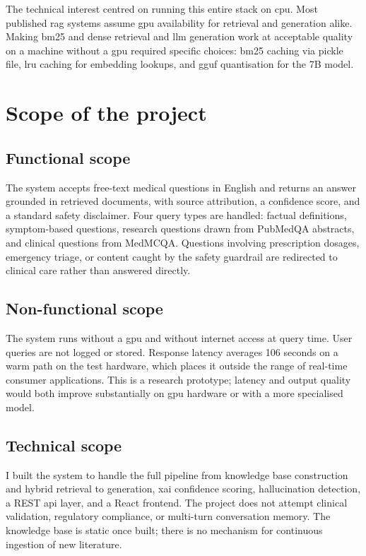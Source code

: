 The technical interest centred on running this entire stack on \ac{cpu}. Most published \ac{rag} systems assume \ac{gpu} availability for retrieval and generation alike. Making \ac{bm25} and dense retrieval and \ac{llm} generation work at acceptable quality on a machine without a \ac{gpu} required specific choices: \ac{bm25} caching via pickle file, \ac{lru} caching for embedding lookups, and \ac{gguf} quantisation for the 7B model.

\section{Scope of the project}

\subsection{Functional scope}

The system accepts free-text medical questions in English and returns an answer grounded in retrieved documents, with source attribution, a confidence score, and a standard safety disclaimer. Four query types are handled: factual definitions, symptom-based questions, research questions drawn from \allowbreak{}PubMedQA abstracts, and clinical questions from MedMCQA. Questions involving prescription dosages, emergency triage, or content caught by the safety guardrail are redirected to clinical care rather than answered directly.

\subsection{Non-functional scope}

The system runs without a \ac{gpu} and without internet access at query time. User queries are not logged or stored. Response latency averages 106 seconds on a warm path on the test hardware, which places it outside the range of real-time consumer applications. This is a research prototype; latency and output quality would both improve substantially on \ac{gpu} hardware or with a more specialised model.

\subsection{Technical scope}

I built the system to handle the full pipeline from knowledge base construction and hybrid retrieval to generation, \ac{xai} confidence scoring, hallucination detection, a REST \ac{api} layer, and a React frontend. The project does not attempt clinical validation, regulatory compliance, or multi-turn conversation memory. The knowledge base is static once built; there is no mechanism for continuous ingestion of new literature.

